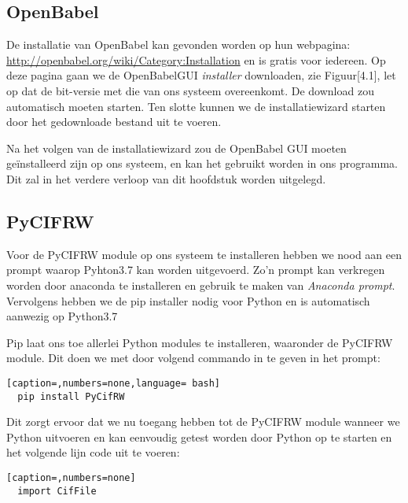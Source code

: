 \subsection{OpenBabel}  
De installatie van OpenBabel kan gevonden worden op hun webpagina: \url{http://openbabel.org/wiki/Category:Installation} en is gratis voor iedereen. Op deze pagina gaan we de OpenBabelGUI \textit{installer} downloaden, zie Figuur[4.1], let op dat de bit-versie met die van ons systeem overeenkomt. De download zou automatisch moeten starten. Ten slotte kunnen we de installatiewizard starten door het gedownloade bestand uit te voeren.
\par
Na het volgen van de installatiewizard zou de OpenBabel GUI moeten geïnstalleerd zijn op ons systeem, en kan het gebruikt worden in ons programma. Dit zal in het verdere verloop van dit hoofdstuk worden uitgelegd.

\subsection{PyCIFRW}
Voor de PyCIFRW module op ons systeem te installeren hebben we nood aan een prompt waarop Pyhton3.7 kan worden uitgevoerd. Zo'n prompt kan verkregen worden door anaconda te installeren en gebruik te maken van \textit{Anaconda prompt}. Vervolgens hebben we de pip installer nodig voor Python en is automatisch aanwezig op Python3.7
\par 
Pip laat ons toe allerlei Python modules te installeren, waaronder de PyCIFRW module. Dit doen we met door volgend commando in te geven in het prompt:
\begin{lstlisting}[caption=,numbers=none,language= bash]
  pip install PyCifRW
\end{lstlisting}
Dit zorgt ervoor dat we nu toegang hebben tot de PyCIFRW module wanneer we Python uitvoeren en kan eenvoudig getest worden door Python op te starten en het volgende lijn code uit te voeren:
\begin{lstlisting}[caption=,numbers=none]
  import CifFile
\end{lstlisting}

